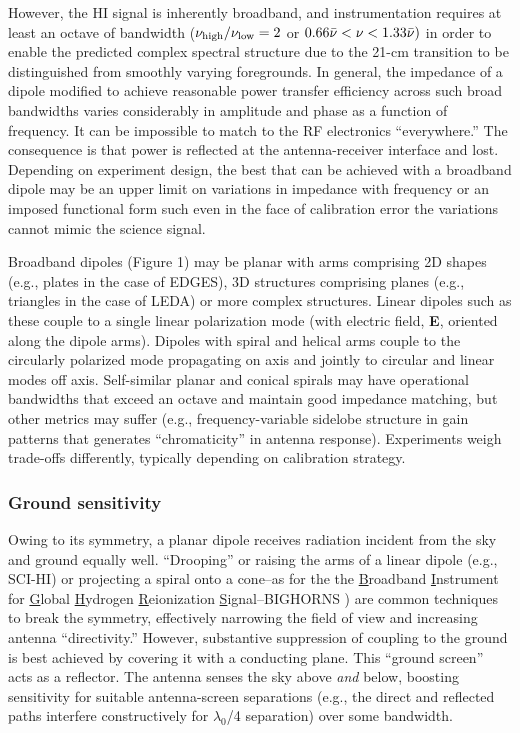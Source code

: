 However, the HI signal is inherently broadband, and instrumentation requires at least an octave of bandwidth ($\nu_{\rm high}/\nu_{\rm low}=2$ or $0.66\Bar{\nu}<\nu<1.33\Bar{\nu})$ in order to enable the predicted complex spectral structure due to the 21-cm transition to be distinguished from  smoothly varying foregrounds.  In general, the impedance of a dipole modified to achieve reasonable power transfer efficiency across such broad bandwidths varies considerably in amplitude and phase as a function of frequency.   It can be impossible to match to the RF electronics ``everywhere.''  The consequence is that power is reflected at the antenna-receiver interface and lost. Depending on experiment design, the best that can be achieved with a broadband dipole may be an upper limit on variations in impedance with frequency or an imposed functional form such even in the face of calibration error the variations cannot mimic the science signal.

Broadband dipoles (Figure 1) may be planar with arms comprising 2D shapes (e.g., plates in the case of EDGES), 3D structures comprising planes  (e.g., triangles in the case of LEDA) or more complex structures.  Linear dipoles such as these couple to a single linear polarization mode (with electric field, {\bf E}, oriented along the dipole arms).  Dipoles with spiral and helical arms couple to the circularly polarized mode propagating on axis and jointly to circular and linear modes off axis.  Self-similar planar and conical spirals may have operational bandwidths that exceed an octave and maintain good impedance matching, but other metrics may suffer (e.g., frequency-variable sidelobe structure in gain patterns that generates ``chromaticity'' in antenna response).  Experiments weigh trade-offs differently, typically depending on calibration strategy.

\subsubsection{Ground sensitivity}

Owing to its symmetry, a planar dipole receives radiation incident from the sky and ground equally well.  ``Drooping'' or raising the arms of a linear dipole (e.g., SCI-HI) or projecting a spiral onto a cone--as for the the {\underline B}roadband {\underline I}nstrument for {\underline G}lobal {\underline H}ydrogen {\underline R}eionization {\underline S}ignal--BIGHORNS \cite{sokolowski15}
) are common techniques to break the symmetry, effectively narrowing the field of view and increasing antenna ``directivity.''  However, substantive suppression of coupling to the ground is best achieved by covering it with  a conducting plane.  This ``ground screen'' acts as a reflector.  The antenna senses the sky above {\it and} below, boosting sensitivity for suitable antenna-screen separations (e.g., the direct and reflected paths interfere constructively for $\lambda_0$/4 separation) over some bandwidth. 

